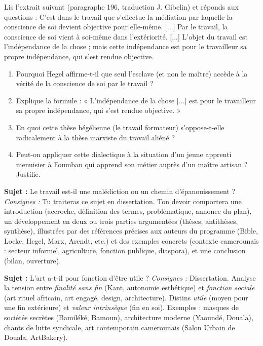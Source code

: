 \documentclass[11pt]{article}
\newcounter{popsec}
\newcounter{popsub}
\newcommand{\courssub}[1]{%
  \stepcounter{popsub}%
  \par\vspace{9pt}\noindent{\popxbold\fontsize{11.5}{13}\selectfont\color{popink}{\color{poporange}\thepopsec.\thepopsub}\hspace{6pt}#1}\par\nopagebreak\vspace{4pt}
}
\begin{document}
\begin{exercice}
Lis l'extrait suivant (paragraphe 196, traduction J. Gibelin) et réponds aux questions :
\guillemotleft C'est dans le travail que s'effectue la médiation par laquelle la conscience de soi devient objective pour elle-même. [...] Par le travail, la conscience de soi vient à soi-même dans l'extériorité. [...] L'objet du travail est l'indépendance de la chose ; mais cette indépendance est pour le travailleur sa propre indépendance, qui s'est rendue objective. \guillemotright
\begin{enumerate}
\item Pourquoi Hegel affirme-t-il que seul l'esclave (et non le maître) accède à la vérité de la conscience de soi par le travail ?
\item Explique la formule : « L'indépendance de la chose [...] est pour le travailleur sa propre indépendance, qui s'est rendue objective. »
\item En quoi cette thèse hégélienne (le travail formateur) s'oppose-t-elle radicalement à la thèse marxiste du travail aliéné ?
\item Peut-on appliquer cette dialectique à la situation d'un jeune apprenti menuisier à Foumban qui apprend son métier auprès d'un maître artisan ? Justifie.
\end{enumerate}
\end{exercice}

\courssub{Je me prépare au Bac}

\begin{exercice}
\textbf{Sujet :} \guillemotleft Le travail est-il une malédiction ou un chemin d'épanouissement ? \guillemotright
\textit{Consignes :} Tu traiteras ce sujet en dissertation. Ton devoir comportera une introduction (accroche, définition des termes, problématique, annonce du plan), un développement en deux ou trois parties argumentées (thèses, antithèses, synthèse), illustrées par des références précises aux auteurs du programme (Bible, Locke, Hegel, Marx, Arendt, etc.) et des exemples concrets (contexte camerounais : secteur informel, agriculture, fonction publique, diaspora), et une conclusion (bilan, ouverture).
\end{exercice}

\begin{exercice}
\textbf{Sujet :} \guillemotleft L'art a-t-il pour fonction d'être utile ? \guillemotright
\textit{Consignes :} Dissertation. Analyse la tension entre \emph{finalité sans fin} (Kant, autonomie esthétique) et \emph{fonction sociale} (art rituel africain, art engagé, design, architecture). Distins \emph{utile} (moyen pour une fin extérieure) et \emph{valeur intrinsèque} (fin en soi). Exemples : masques de sociétés secrètes (Bamiléké, Bamoun), architecture moderne (Yaoundé, Douala), chants de lutte syndicale, art contemporain camerounais (Salon Urbain de Douala, ArtBakery).
\end{exercice}
\end{document}
